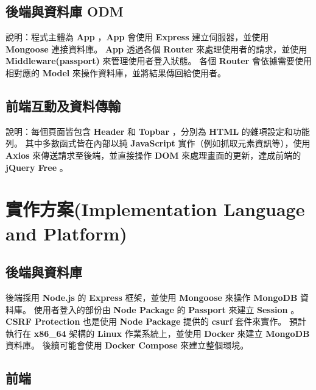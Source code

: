 \documentclass{article}
\begin{document}
\subsection{後端與資料庫 ODM}



\bigskip

說明：程式主體為 \textbf{App} ，\textbf{App} 會使用 \textbf{Express} 建立伺服器，並使用 \textbf{Mongoose} 連接資料庫。
\textbf{App} 透過各個 \textbf{Router} 來處理使用者的請求，並使用 \textbf{Middleware(passport)} 來管理使用者登入狀態。
各個 \textbf{Router} 會依據需要使用相對應的 \textbf{Model} 來操作資料庫，並將結果傳回給使用者。

\pagebreak

\subsection{前端互動及資料傳輸}



說明：每個頁面皆包含 \textbf{Header} 和 \textbf{Topbar} ，分別為 \textbf{HTML} 的雜項設定和功能列。
其中多數函式皆在內部以純 \textbf{JavaScript} 實作（例如抓取元素資訊等），使用 \textbf{Axios} 來傳送請求至後端，並直接操作 \textbf{DOM} 來處理畫面的更新，達成前端的 \textbf{jQuery Free} 。

\newpage

\section[實作方案(IMPLEMENTATION LANGUAGE AND PLATFORM)]{實作方案(Implementation Language and Platform)}

\subsection{後端與資料庫}

後端採用 \textbf{Node.js} 的 \textbf{Express} 框架，並使用 \textbf{Mongoose} 來操作 \textbf{MongoDB} 資料庫。
使用者登入的部份由 \textbf{Node Package} 的 \textbf{Passport} 來建立 \textbf{Session} 。
\textbf{CSRF Protection} 也是使用 \textbf{Node Package} 提供的 \textbf{csurf} 套件來實作。
預計執行在 \textbf{x86\_64} 架構的 \textbf{Linux} 作業系統上，並使用 \textbf{Docker} 來建立 \textbf{MongoDB} 資料庫。
後續可能會使用 \textbf{Docker Compose} 來建立整個環境。

\subsection{前端}
\end{document}
